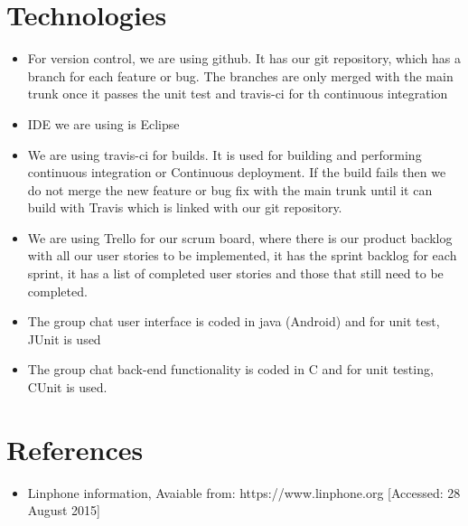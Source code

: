 \documentclass[a4paper]{article}
\begin{document}
\section{Technologies}
\begin{itemize}
\item For version control, we are using github. It has our git repository, which has a branch for each feature or bug. The branches are only merged with the main trunk once it passes the unit test and travis-ci for th continuous integration\\
\item IDE we are using is Eclipse\\
\item We are using travis-ci for builds. It is used for building and performing continuous integration or Continuous deployment. If the build fails then we do not merge the new feature or bug fix with the main trunk until it can build with Travis which is linked with our git repository.\\
\item We are using Trello for our scrum board, where there is our product backlog with all our user stories to be implemented, it has the sprint backlog for each sprint, it has a list of completed user stories and those that still need to be completed.\\
\item The group chat user interface is coded in java (Android) and for unit test, JUnit is used\\
\item The group chat back-end functionality is coded in C and for unit testing, CUnit is used.

\end{itemize}

\section{References}
\begin{itemize}
\item Linphone information, Avaiable from: https://www.linphone.org [Accessed: 28 August 2015]
\end{itemize}
\end{document}
